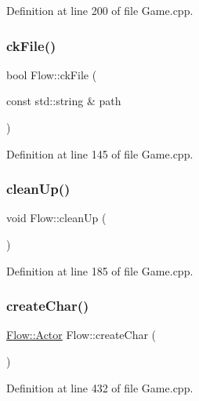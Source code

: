 Definition at line 200 of file Game.\+cpp.

\hypertarget{namespace_flow_ac0d6ec00171135acca42eea277c889a1}{}\label{namespace_flow_ac0d6ec00171135acca42eea277c889a1} 
\subsubsection{\texorpdfstring{ck\+File()}{ckFile()}}
{\footnotesize\ttfamily bool Flow\+::ck\+File (\begin{DoxyParamCaption}\item[{const std\+::string \&}]{path }\end{DoxyParamCaption})}



Definition at line 145 of file Game.\+cpp.

\hypertarget{namespace_flow_aa61423790cc3ea1eb33e45bb4596042a}{}\label{namespace_flow_aa61423790cc3ea1eb33e45bb4596042a} 
\subsubsection{\texorpdfstring{clean\+Up()}{cleanUp()}}
{\footnotesize\ttfamily void Flow\+::clean\+Up (\begin{DoxyParamCaption}{ }\end{DoxyParamCaption})}



Definition at line 185 of file Game.\+cpp.

\hypertarget{namespace_flow_abe71679482e53f77d3dabbf951405ff3}{}\label{namespace_flow_abe71679482e53f77d3dabbf951405ff3} 
\subsubsection{\texorpdfstring{create\+Char()}{createChar()}}
{\footnotesize\ttfamily \hyperlink{class_flow_1_1_actor}{Flow\+::\+Actor} Flow\+::create\+Char (\begin{DoxyParamCaption}{ }\end{DoxyParamCaption})}



Definition at line 432 of file Game.\+cpp.

\hypertarget{namespace_flow_a43e74dfbdf28d1c009d3601ac1ca3cfd}{}\label{namespace_flow_a43e74dfbdf28d1c009d3601ac1ca3cfd} 

